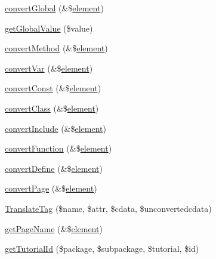 \begin{DoxyCompactItemize}
\item 
\hyperlink{class_p_d_fdefault_converter_a1d1bb2b092be87ba7a40b0064ac43b6c}{convert\-Global} (\&\$\hyperlink{bug-904820_8php_aa94081298ab2dfd0f261cce6c203d9aa}{element})
\item 
\hyperlink{class_p_d_fdefault_converter_a91e68a982c5b0e517466b18d6ad5d572}{get\-Global\-Value} (\$value)
\item 
\hyperlink{class_p_d_fdefault_converter_ad2593363c9de7c36ee6f4f7de17ba94d}{convert\-Method} (\&\$\hyperlink{bug-904820_8php_aa94081298ab2dfd0f261cce6c203d9aa}{element})
\item 
\hyperlink{class_p_d_fdefault_converter_ac5907fa8ea3429f4823e8f937b5a98c1}{convert\-Var} (\&\$\hyperlink{bug-904820_8php_aa94081298ab2dfd0f261cce6c203d9aa}{element})
\item 
\hyperlink{class_p_d_fdefault_converter_a87097a10d0995a404c71a0b22e2c6b7d}{convert\-Const} (\&\$\hyperlink{bug-904820_8php_aa94081298ab2dfd0f261cce6c203d9aa}{element})
\item 
\hyperlink{class_p_d_fdefault_converter_afec21ed9dd3b8ac7495c4d6d5741d7af}{convert\-Class} (\&\$\hyperlink{bug-904820_8php_aa94081298ab2dfd0f261cce6c203d9aa}{element})
\item 
\hyperlink{class_p_d_fdefault_converter_a548baade863d365286d46ca66564711f}{convert\-Include} (\&\$\hyperlink{bug-904820_8php_aa94081298ab2dfd0f261cce6c203d9aa}{element})
\item 
\hyperlink{class_p_d_fdefault_converter_acd30d12b8e21ce245f1b9dbbf8bf29b0}{convert\-Function} (\&\$\hyperlink{bug-904820_8php_aa94081298ab2dfd0f261cce6c203d9aa}{element})
\item 
\hyperlink{class_p_d_fdefault_converter_a9f23827e97c2672a94ff615d9bb00601}{convert\-Define} (\&\$\hyperlink{bug-904820_8php_aa94081298ab2dfd0f261cce6c203d9aa}{element})
\item 
\hyperlink{class_p_d_fdefault_converter_a48d30cbead70c887449fda723aa0bb6e}{convert\-Page} (\&\$\hyperlink{bug-904820_8php_aa94081298ab2dfd0f261cce6c203d9aa}{element})
\item 
\hyperlink{class_p_d_fdefault_converter_ab9ab0247549341b08f5893f99c64b3c1}{\-Translate\-Tag} (\$name, \$attr, \$cdata, \$unconvertedcdata)
\item 
\hyperlink{class_p_d_fdefault_converter_ad39e717881e42150610bbed94471f8bf}{get\-Page\-Name} (\&\$\hyperlink{bug-904820_8php_aa94081298ab2dfd0f261cce6c203d9aa}{element})
\item 
\hyperlink{class_p_d_fdefault_converter_a98de4e6484c42e491de454411f606871}{get\-Tutorial\-Id} (\$package, \$subpackage, \$tutorial, \$id)

\end{DoxyCompactItemize}
